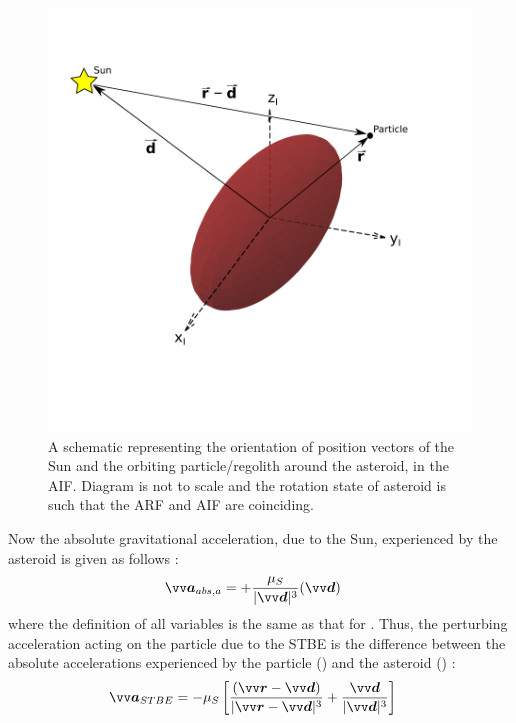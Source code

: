 \begin{figure}[htb]
\centering
\captionsetup{justification=centering}
\includegraphics[width=\textwidth, height=0.35\textheight, keepaspectratio=true]{stbe_bodyframe_edit_2.pdf}
\caption{A schematic representing the orientation of position vectors of the Sun and the orbiting particle/regolith around the asteroid, in the \gls{AIF}. Diagram is not to scale and the rotation state of asteroid is such that the \gls{ARF} and \gls{AIF} are coinciding.}
\label{fig:stbe_bodyFrame}
\end{figure}
\FloatBarrier
Now the absolute gravitational acceleration, due to the Sun, experienced by the asteroid is given as follows \parencite{scheeresBook}:
\begin{align}
    \bv{a}_{abs, a} &= +\frac{\mu_S}{|\bv{d}|^3} (\bv{d})
    \label{eqn:stbe_asteroid_abs_acc}
\end{align}
where the definition of all variables is the same as that for . Thus, the perturbing acceleration acting on the particle due to the \gls{STBE} is the difference between the absolute accelerations experienced by the particle () and the asteroid () \parencite{scheeresBook}:
\begin{align}
    \bv{a}_{STBE} &= -\mu_S \left[ \frac{(\bv{r} - \bv{d})}{|\bv{r} - \bv{d}|^3} + \frac{\bv{d}}{|\bv{d}|^3} \right]
    \label{eqn:stbe_acc}
\end{align}
